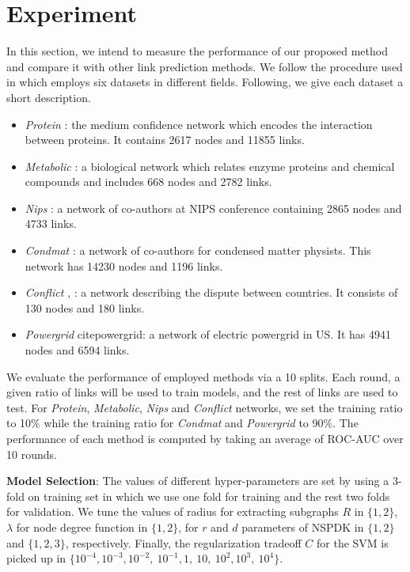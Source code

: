 \documentclass[runningheads,a4paper]{llncs}
\begin{document}
\section{Experiment}
In this section, we intend to measure the performance of our proposed method and compare it with other link prediction methods. We follow the procedure used in \cite{matrix-factorization} which employs six datasets in different fields. Following, we give each dataset a short description.
\begin{itemize}
\item \textit{Protein }\cite{protein-protein}: the medium confidence network which encodes the interaction between proteins. It contains 2617 nodes and 11855 links.

\item \textit{Metabolic} \cite{metabolic}: a biological network which relates enzyme proteins and chemical compounds and includes 668 nodes and 2782 links.

\item \textit{Nips} \cite{nips}: a network of co-authors at NIPS conference containing 2865 nodes and 4733 links. 

\item \textit{Condmat} \cite{condmat}: a network of co-authors for condensed matter physists. This network has 14230 nodes and 1196 links.

\item \textit{Conflict} \cite{conflict1}, \cite{conflict2}: a network describing the dispute between countries. It consists of 130 nodes and 180 links.

\item \textit{Powergrid} cite{powergrid}: a network of electric powergrid in US. It has 4941 nodes and 6594 links.
\end{itemize}

We evaluate the performance of employed methods via a 10 splits. Each round, a given ratio of links will be used to train models, and the rest of links are used to test. For \textit{Protein}, \textit{Metabolic}, \textit{Nips} and \textit{Conflict} networks, we set the training ratio to 10$\%$ while the training ratio for \textit{Condmat} and \textit{Powergrid} to 90$\%$. The performance of each method is computed by taking an average of ROC-AUC over 10 rounds.

\textbf{Model Selection}: The values of different hyper-parameters are set by using a 3-fold on training set in which we use one fold for training and the rest two folds for validation. We tune the values of radius for extracting subgraphs $R$ in $\lbrace 1, 2 \rbrace$, $\lambda$ for node degree function in $\lbrace 1, 2 \rbrace$, for $r$ and $d$ parameters of NSPDK in $\lbrace  1, 2 \rbrace$ and $\lbrace  1, 2, 3 \rbrace$, respectively. Finally, the regularization tradeoff $C$ for the SVM is picked up in $\lbrace 10^{-4}, 10^{-3}, 10^{-2},\ 10^{-1}, 1,\ 10,\ 10^2, 10^3,\ 10^4 \rbrace$.
\end{document}
